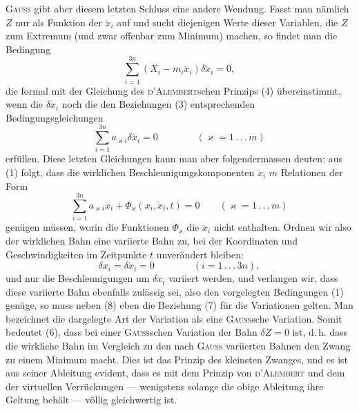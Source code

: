 \textsc{Gauss} gibt aber diesem letzten Schluss eine andere Wendung. Fasst
man nämlich $Z$ nur als Funktion der $\ddot x_i$ auf und sucht diejenigen Werte dieser
Variablen, die $Z$ zum Extremum (und zwar offenbar zum Minimum) machen,
so findet man die Bedingung
\[
\sum_{i=1}^{3n}(X_i-m_i\ddot x_i)\delta\ddot x_i=0,\tag{6}
\]
\noindent die formal mit der Gleichung des \textsc{d’Alembert}schen Prinzips (4) übereinstimmt,
wenn die $\delta\ddot x_i$ noch die den Beziehungen (3) entsprechenden Bedingungsgleichungen
\[
\sum_{i=1}^{3n}a_{\varkappa i}\delta\ddot x_i=0
\qquad\qquad(\varkappa=1\, .\, .\, .\, m)\tag{7}
\]
\noindent erfüllen. Diese letzten Gleichungen kann man aber folgendermassen deuten:
aus (1) folgt, dass die wirklichen Beschleunigungskomponenten $\ddot x_i$ $m$ Relationen
der Form
\[
\sum_{i=1}^{3n}a_{\varkappa i}\ddot x_i+\Phi_\varkappa(x_i,\dot x_i,t)=0
\qquad(\varkappa=1\, .\, .\, .\, m)\tag{8}
\]
\noindent genügen müssen, worin die Funktionen $\Phi_\varkappa$ die $\ddot x_i$ nicht enthalten. Ordnen
wir also der wirklichen Bahn eine variierte Bahn zu, bei der Koordinaten
und Geschwindigkeiten im Zeitpunkte $t$ unverändert bleiben:
\[
\delta x_i=\delta\dot x_i=0\qquad\qquad(i=1\, .\, .\, .\, 3n),
\]
\noindent und nur die Beschleunigungen um $\delta\ddot x_i$ variiert werden, und verlangen wir, dass
diese variierte Bahn ebenfalls zulässig sei, also den vorgelegten Bedingungen
(1) genüge, so muss neben (8) eben die Beziehung (7) für die Variationen
gelten. Man bezeichnet die dargelegte Art der Variation als eine \textsc{Gauss}sche
\clearpage{}
\noindent Variation. Somit bedeutet (6), dass bei einer \textsc{Gauss}schen Variation der Bahn
$\delta Z=0$ ist, d.\,h. dass die wirkliche Bahn im Vergleich zu den nach \textsc{Gauss}
variierten Bahnen den Zwang zu einem Minimum macht. Dies ist das Prinzip
des kleinsten Zwanges, und es ist aus seiner Ableitung evident, dass es mit
dem Prinzip von \textsc{d’Alembert} und dem der virtuellen Verrückungen — wenigstens
solange die obige Ableitung ihre Geltung behält — völlig gleichwertig ist.

